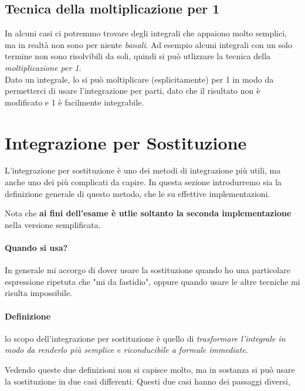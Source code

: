\subsection*{Tecnica della moltiplicazione per 1}
In alcuni casi ci potremmo trovare degli integrali che appaiono molto semplici, ma in realtà non sono per niente \emph{banali}.
Ad esempio alcuni integrali con un solo termine non sono risolvibili da soli, quindi si può utlizzare la tecnica della \emph{moltiplicazione per 1}.
\\Dato un integrale, lo si può moltiplicare (esplicitamente) per 1 in modo da permetterci di usare l'integrazione per parti, dato che il risultato non è modificato e 1 è facilmente integrabile.

\section{Integrazione per Sostituzione}
L'integrazione per sostituzione è uno dei metodi di integrazione più utili, ma anche uno dei più complicati da capire.
In questa sezione introdurremo sia la definizione generale di questo metodo, che le su effettive implementazioni.

Nota che \textbf{ai fini dell'esame è utlie soltanto la seconda implementazione} nella versione semplificata.

\paragraph{Quando si usa?} 
In generale mi accorgo di dover usare la sostituzione quando ho una particolare espressione ripetuta che "mi da fastidio", 
oppure quando usare le altre tecniche mi risulta impossibile.

\paragraph*{Definizione} lo scopo dell'integrazione per sostituzione è quello di \emph{trasformare l'integrale in modo da renderlo più semplice e riconducibile a formule immediate}.

Vedendo queste due definizioni non si capisce molto,
ma in sostanza si può usare la sostituzione in due casi differenti.
Questi due casi hanno dei passaggi diversi,

